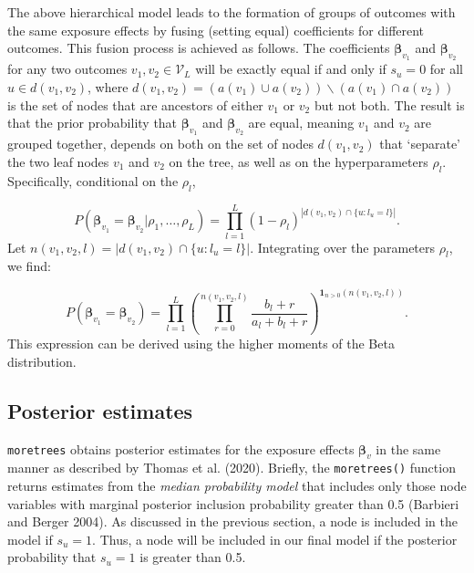 \documentclass[]{article}
\begin{document}
The above hierarchical model leads to the formation of groups of
outcomes with the same exposure effects by fusing (setting equal)
coefficients for different outcomes. This fusion process is achieved as
follows. The coefficients \(\boldsymbol{\beta}_{v_1}\) and
\(\boldsymbol{\beta}_{v_2}\) for any two outcomes
\(v_1, v_2 \in \mathcal{V}_L\) will be exactly equal if and only if
\(s_u = 0\) for all \(u \in d(v_1, v_2)\), where
\(d(v_1, v_2) = (a(v_1) \cup a(v_2)) \backslash (a(v_1) \cap a(v_2))\)
is the set of nodes that are ancestors of either \(v_1\) or \(v_2\) but
not both. The result is that the prior probability that
\(\boldsymbol{\beta}_{v_1}\) and \(\boldsymbol{\beta}_{v_2}\) are equal,
meaning \(v_1\) and \(v_2\) are grouped together, depends on both on the
set of nodes \(d(v_1, v_2)\) that `separate' the two leaf nodes \(v_1\)
and \(v_2\) on the tree, as well as on the hyperparameters \(\rho_l\).
Specifically, conditional on the \(\rho_l\),

\[P\left(\mathbf{\beta}_{v_1} = \mathbf{\beta}_{v_2} \vert \rho_1, \dots, \rho_L \right) = \prod_{l=1}^L (1 - \rho_l)^{\left\vert d(v_1, v_2) \cap \lbrace u: l_u = l \rbrace \right\vert}.\]
Let
\(n(v_1, v_2, l) = \left\vert d(v_1, v_2) \cap \lbrace u: l_u = l \rbrace \right\vert\).
Integrating over the parameters \(\rho_l\), we find:

\[P\left(\mathbf{\beta}_{v_1} = \mathbf{\beta}_{v_2}\right) = \prod_{l = 1}^L \left(\prod_{r = 0}^{n(v_1,v_2,l)} \dfrac{b_l + r}{a_l + b_l + r}\right)^{\mathbf{1}_{n > 0}\left(n(v_1,v_2,l)\right)}. \]
This expression can be derived using the higher moments of the Beta
distribution.

\hypertarget{posterior-estimates}{%
\subsection{Posterior estimates}\label{posterior-estimates}}

\texttt{moretrees} obtains posterior estimates for the exposure effects
\(\boldsymbol{\beta}_v\) in the same manner as described by Thomas et
al. (2020). Briefly, the \texttt{moretrees()} function returns estimates
from the \emph{median probability model} that includes only those node
variables with marginal posterior inclusion probability greater than 0.5
(Barbieri and Berger 2004). As discussed in the previous section, a node
is included in the model if \(s_u = 1\). Thus, a node will be included
in our final model if the posterior probability that \(s_u = 1\) is
greater than 0.5.
\end{document}
